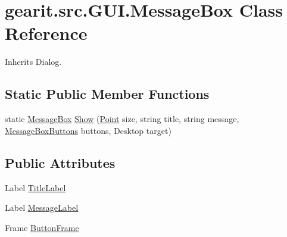 \hypertarget{classgearit_1_1src_1_1_g_u_i_1_1_message_box}{\section{gearit.\+src.\+G\+U\+I.\+Message\+Box Class Reference}
\label{classgearit_1_1src_1_1_g_u_i_1_1_message_box}
}


Inherits Dialog.

\subsection*{Static Public Member Functions}
\begin{DoxyCompactItemize}
\item 
static \hyperlink{classgearit_1_1src_1_1_g_u_i_1_1_message_box}{Message\+Box} \hyperlink{classgearit_1_1src_1_1_g_u_i_1_1_message_box_a67b634eed3bc971b2272549661e3a616}{Show} (\hyperlink{_seidel_decomposer_8cs_a2a603daa342d957bd27dd0b1eb38af15}{Point} size, string title, string message, \hyperlink{namespacegearit_1_1src_1_1_g_u_i_a142175becd6241f1b8c959354f0df291}{Message\+Box\+Buttons} buttons, Desktop target)
\end{DoxyCompactItemize}
\subsection*{Public Attributes}
\begin{DoxyCompactItemize}
\item 
Label \hyperlink{classgearit_1_1src_1_1_g_u_i_1_1_message_box_a427aa0e453d98cf59ffabad81d61bda8}{Title\+Label}
\item 
Label \hyperlink{classgearit_1_1src_1_1_g_u_i_1_1_message_box_a7499a39d800473f8d2fb2a4c60c602c4}{Message\+Label}
\item 
Frame \hyperlink{classgearit_1_1src_1_1_g_u_i_1_1_message_box_aa0a2cb0628b65f402993fc8d95136758}{Button\+Frame}
\end{DoxyCompactItemize}


